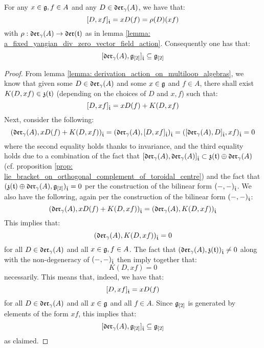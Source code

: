        \begin{lemma} \label{lemma: no_polynomial_terms_for_derivation_action_on_multiloop_algebras}
            For any $x \in \mathfrak{g}, f \in A$ and any $D \in \mathfrak{der}_{\gamma}(A)$, we have that:
                $$[D, xf]_{\hat{\mathfrak{t}}} = x D(f) = \rho(D)(xf)$$
            with $\rho: \mathfrak{der}_{\gamma}(A) \to \mathfrak{der}(\mathfrak{t})$ as in lemma \ref{lemma: a_fixed_yangian_div_zero_vector_field_action}. Consequently one has that:
                $$[\mathfrak{der}_{\gamma}(A), \mathfrak{g}_{[2]}]_{\hat{\mathfrak{t}}} \subseteq \mathfrak{g}_{[2]}$$
        \end{lemma}
            \begin{proof}
                From lemma \ref{lemma: derivation_action_on_multiloop_algebras}, we know that given some $D \in \mathfrak{der}_{\gamma}(A)$ and some $x \in \mathfrak{g}$ and $f \in A$, there shall exist $K(D, xf) \in \mathfrak{z}(\mathfrak{t})$ (depending on the choices of $D$ and $x, f$) such that:
                    $$[D, xf]_{\hat{\mathfrak{t}}} = x D(f) + K(D, xf)$$
                Next, consider the following:
                    $$( \mathfrak{der}_{\gamma}(A), x D(f) + K(D, xf) )_{\hat{\mathfrak{t}}} = ( \mathfrak{der}_{\gamma}(A), [D, xf]_{\hat{\mathfrak{t}}} )_{\hat{\mathfrak{t}}} = ( [\mathfrak{der}_{\gamma}(A), D]_{\hat{\mathfrak{t}}}, xf )_{\hat{\mathfrak{t}}} = 0$$
                where the second equality holds thanks to invariance, and the third equality holds due to a combination of the fact that $[\mathfrak{der}_{\gamma}(A), \mathfrak{der}_{\gamma}(A)]_{\hat{\mathfrak{t}}} \subset \mathfrak{z}(\mathfrak{t}) \oplus \mathfrak{der}_{\gamma}(A)$ (cf. proposition \ref{prop: lie_bracket_on_orthogonal_complement_of_toroidal_centre}) and the fact that $(\mathfrak{z}(\mathfrak{t}) \oplus \mathfrak{der}_{\gamma}(A), \mathfrak{g}_{[2]})_{\hat{\mathfrak{t}}} = 0$ per the construction of the bilinear form $(-, -)_{\hat{\mathfrak{t}}}$. We also have the following, again per the construction of the bilinear form $(-, -)_{\hat{\mathfrak{t}}}$:
                    $$( \mathfrak{der}_{\gamma}(A), x D(f) + K(D, xf) )_{\hat{\mathfrak{t}}} = ( \mathfrak{der}_{\gamma}(A), K(D, xf) )_{\hat{\mathfrak{t}}}$$
                This implies that:
                    $$( \mathfrak{der}_{\gamma}(A), K(D, xf) )_{\hat{\mathfrak{t}}} = 0$$
                for all $D \in \mathfrak{der}_{\gamma}(A)$ and all $x \in \mathfrak{g}, f \in A$. The fact that $( \mathfrak{der}_{\gamma}(A), \mathfrak{z}(\mathfrak{t}) )_{\hat{\mathfrak{t}}} \not = 0$ along with the non-degeneracy of $(-, -)_{\hat{\mathfrak{t}}}$ then imply together that:
                    $$K(D, xf) = 0$$
                necessarily. This means that, indeed, we have that:
                    $$[D, xf]_{\hat{\mathfrak{t}}} = x D(f)$$
                for all $D \in \mathfrak{der}_{\gamma}(A)$ and all $x \in \mathfrak{g}$ and all $f \in A$. Since $\mathfrak{g}_{[2]}$ is generated by elements of the form $xf$, this implies that:
                    $$[\mathfrak{der}_{\gamma}(A), \mathfrak{g}_{[2]}]_{\hat{\mathfrak{t}}} \subseteq \mathfrak{g}_{[2]}$$
                as claimed. 
            \end{proof}
